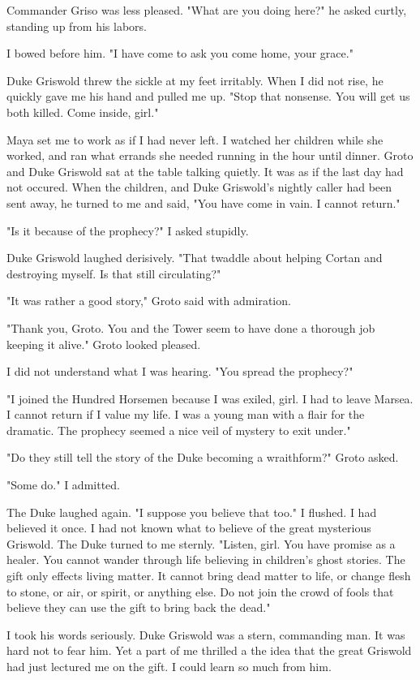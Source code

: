 \documentclass{article}
\begin{document}
Commander Griso was less pleased. "What are you doing here?" he asked curtly, standing up from his labors.

I bowed before him. "I have come to ask you come home, your grace."

Duke Griswold threw the sickle at my feet irritably. When I did not rise, he quickly gave me his hand and pulled me up. "Stop that nonsense. You will get us both killed. Come inside, girl."

Maya set me to work as if I had never left. I watched her children while she worked, and ran what errands she needed running in the hour until dinner. Groto and Duke Griswold sat at the table talking quietly. It was as if the last day had not occured. When the children, and Duke Griswold's nightly caller had been sent away, he turned to me and said, "You have come in vain. I cannot return."

"Is it because of the prophecy?" I asked stupidly. 

Duke Griswold laughed derisively. "That twaddle about helping Cortan and destroying myself. Is that still circulating?"
 
"It was rather a good story," Groto said with admiration. 

"Thank you, Groto. You and the Tower seem to have done a thorough job keeping it alive." Groto looked pleased. 

I did not understand what I was hearing. "You spread the prophecy?"

"I joined the Hundred Horsemen because I was exiled, girl. I had to leave Marsea. I cannot return if I value my life. I was a young man with a flair for the dramatic. The prophecy seemed a nice veil of mystery to exit under."

"Do they still tell the story of the Duke becoming a wraithform?" Groto asked.

"Some do." I admitted.

The Duke laughed again. "I suppose you believe that too." I flushed. I had believed it once. I had not known what to believe of the great mysterious Griswold. The Duke turned to me sternly. "Listen, girl. You have promise as a healer. You cannot wander through life believing in children's ghost stories. The gift only effects living matter. It cannot bring dead matter to life, or change flesh to stone, or air, or spirit, or anything else. Do not join the crowd of fools that believe they can use the gift to bring back the dead." 

I took his words seriously. Duke Griswold was a stern, commanding man. It was hard not to fear him. Yet a part of me thrilled a the idea that the great Griswold had just lectured me on the gift. I could learn so much from him.
\end{document}
